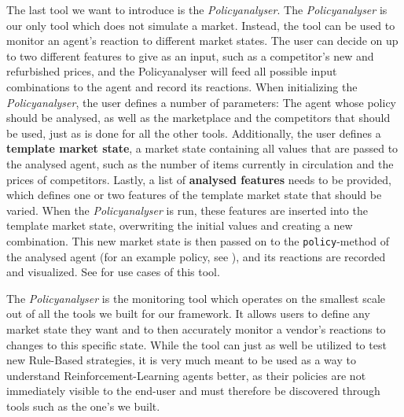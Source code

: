 The last tool we want to introduce is the \emph{Policyanalyser}. The \emph{Policyanalyser} is our only tool which does not simulate a market. Instead, the tool can be used to monitor an agent's reaction to different market states. The user can decide on up to two different features to give as an input, such as a competitor's new and refurbished prices, and the Policyanalyser will feed all possible input combinations to the agent and record its reactions. When initializing the \emph{Policyanalyser}, the user defines a number of parameters: The agent whose policy should be analysed, as well as the marketplace and the competitors that should be used, just as is done for all the other tools. Additionally, the user defines a \textbf{template market state}, a market state containing all values that are passed to the analysed agent, such as the number of items currently in circulation and the prices of competitors. Lastly, a list of \textbf{analysed features} needs to be provided, which defines one or two features of the template market state that should be varied. When the \emph{Policyanalyser} is run, these features are inserted into the template market state, overwriting the initial values and creating a new combination. This new market state is then passed on to the \texttt{policy}-method of the analysed agent (for an example policy, see ), and its reactions are recorded and visualized. See  for use cases of this tool.

The \emph{Policyanalyser} is the monitoring tool which operates on the smallest scale out of all the tools we built for our framework. It allows users to define any market state they want and to then accurately monitor a vendor's reactions to changes to this specific state. While the tool can just as well be utilized to test new Rule-Based strategies, it is very much meant to be used as a way to understand Reinforcement-Learning agents better, as their policies are not immediately visible to the end-user and must therefore be discovered through tools such as the one's we built.
